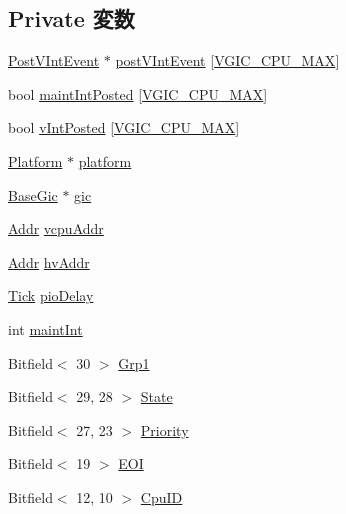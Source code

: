 \subsection*{Private 変数}
\begin{DoxyCompactItemize}
\item 
\hyperlink{classVGic_1_1PostVIntEvent}{PostVIntEvent} $\ast$ \hyperlink{classVGic_a391a6d3a21ceaa229791a17f58d2e0ae}{postVIntEvent} \mbox{[}\hyperlink{classVGic_abdf6630d700683c52d9cd03f11d660ac}{VGIC\_\-CPU\_\-MAX}\mbox{]}
\item 
bool \hyperlink{classVGic_afc202b126ba5621ec4dae742b51889d0}{maintIntPosted} \mbox{[}\hyperlink{classVGic_abdf6630d700683c52d9cd03f11d660ac}{VGIC\_\-CPU\_\-MAX}\mbox{]}
\item 
bool \hyperlink{classVGic_a4108a1761c811efd10f4bd705fab8581}{vIntPosted} \mbox{[}\hyperlink{classVGic_abdf6630d700683c52d9cd03f11d660ac}{VGIC\_\-CPU\_\-MAX}\mbox{]}
\item 
\hyperlink{classPlatform}{Platform} $\ast$ \hyperlink{classVGic_a75b48f1787959a4617f2a599d7c09aab}{platform}
\item 
\hyperlink{classBaseGic}{BaseGic} $\ast$ \hyperlink{classVGic_a2e2266dca56928f63667e994933169ee}{gic}
\item 
\hyperlink{base_2types_8hh_af1bb03d6a4ee096394a6749f0a169232}{Addr} \hyperlink{classVGic_a6967a675bb97fef5858618111567aba0}{vcpuAddr}
\item 
\hyperlink{base_2types_8hh_af1bb03d6a4ee096394a6749f0a169232}{Addr} \hyperlink{classVGic_a382afc2ed37622bb0da354e863a9c121}{hvAddr}
\item 
\hyperlink{base_2types_8hh_a5c8ed81b7d238c9083e1037ba6d61643}{Tick} \hyperlink{classVGic_ac8e969635a78ab9ab123904ccca434cc}{pioDelay}
\item 
int \hyperlink{classVGic_a39c00dce99eb5fe8a22703e2286661f5}{maintInt}
\item 
Bitfield$<$ 30 $>$ \hyperlink{classVGic_a8c9d4553eb4294402cbe8b77c7be7d43}{Grp1}
\item 
Bitfield$<$ 29, 28 $>$ \hyperlink{classVGic_a4ad4e2a479baf0de8e8cdcb0c84276db}{State}
\item 
Bitfield$<$ 27, 23 $>$ \hyperlink{classVGic_a26c7f4132225aed6b8d4356c1601d689}{Priority}
\item 
Bitfield$<$ 19 $>$ \hyperlink{classVGic_ace587c95d7c7ae411d6f8791e02acfb0}{EOI}
\item 
Bitfield$<$ 12, 10 $>$ \hyperlink{classVGic_af2592449a23aee37bc8cf6be36d2efc3}{CpuID}
\item 

\end{DoxyCompactItemize}
